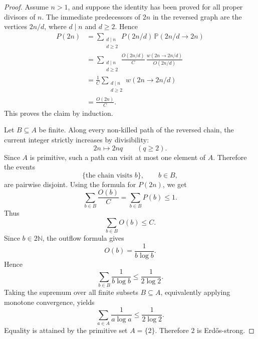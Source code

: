 \documentclass{amsart}
\begin{document}
\begin{proof}
Assume \(n>1\), and suppose the identity has been proved for all proper
divisors of \(n\). The immediate predecessors of \(2n\) in the reversed graph
are the vertices \(2n/d\), where \(d\mid n\) and \(d\ge 2\). Hence
\[
\begin{aligned}
P(2n)
&=
\sum_{\substack{d\mid n\\ d\ge 2}}
P(2n/d)\,
\mathbb P(2n/d\to 2n)  \\
&=
\sum_{\substack{d\mid n\\ d\ge 2}}
\frac{O(2n/d)}{C}\,
\frac{w(2n\to 2n/d)}{O(2n/d)}  \\
&=
\frac{1}{C}
\sum_{\substack{d\mid n\\ d\ge 2}}
w(2n\to 2n/d)  \\
&=
\frac{O(2n)}{C}.
\end{aligned}
\]
This proves the claim by induction.

Let \(B\subseteq A\) be finite. Along every non-killed path of the reversed
chain, the current integer strictly increases by divisibility:
\[
2n\longmapsto 2nq
\qquad(q\ge 2).
\]
Since \(A\) is primitive, such a path can visit at most one element of \(A\).
Therefore the events
\[
\{\text{the chain visits } b\},
\qquad b\in B,
\]
are pairwise disjoint. Using the formula for \(P(2n)\), we get
\[
\sum_{b\in B}\frac{O(b)}{C}
=
\sum_{b\in B}P(b)
\le 1.
\]
Thus
\[
\sum_{b\in B}O(b)\le C.
\]
Since \(b\in 2\mathbb N\), the outflow formula gives
\[
O(b)=\frac{1}{b\log b}.
\]
Hence
\[
\sum_{b\in B}\frac{1}{b\log b}
\le
\frac{1}{2\log 2}.
\]
Taking the supremum over all finite subsets \(B\subseteq A\), equivalently
applying monotone convergence, yields
\[
\sum_{a\in A}\frac{1}{a\log a}
\le
\frac{1}{2\log 2}.
\]
Equality is attained by the primitive set \(A=\{2\}\). Therefore \(2\) is
Erd\H{o}s-strong.
\end{proof}
\end{document}
